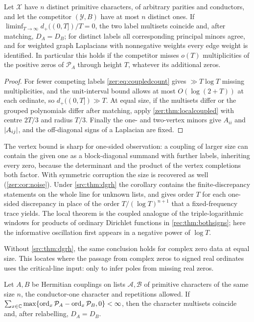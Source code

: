 \begin{corollary}\label{zer:cor:blindall}
Let $\mathcal X$ have $n$ distinct primitive characters, of arbitrary parities and conductors, and let the
competitor $(\mathcal Y,B)$ have at most $n$ distinct ones. If $\liminf_{T\to\infty}d_+((0,T])/T=0$, the two label
multisets coincide and, after matching, $D_A=D_B$; for distinct labels all corresponding principal minors
agree, and for weighted graph Laplacians with nonnegative weights every edge weight is identified. In
particular this holds if the competitor misses $o(T)$ multiplicities of the positive zeros of
$\mathcal P_A$ through height $T$, whatever its additional zeros.
\end{corollary}
\begin{proof}
For fewer competing labels \eqref{zer:eq:coupledcount} gives $\gg T\log T$ missing multiplicities, and the
unit-interval bound allows at most $O(\log(2+T))$ at each ordinate, so $d_+((0,T])\gg T$. At equal size,
if the multisets differ or the grouped polynomials differ after matching, apply
\cref{zer:thm:localcoupled} with centre $2T/3$ and radius $T/3$. Finally the one- and two-vertex minors
give $A_{ii}$ and $\lvert A_{ij}\rvert$, and the off-diagonal signs of a Laplacian are fixed.
\end{proof}

The vertex bound is sharp for one-sided observation: a coupling of larger size can contain the given one
as a block-diagonal summand with further labels, inheriting every zero, because the determinant and the
product of the vertex completions both factor. With symmetric corruption the size is recovered as well
(\cref{zer:cor:noise}). Under \cref{src:thm:dgrh} the corollary contains the finite-discrepancy
statements on the whole line for unknown lists, and gives order $T$ for each one-sided discrepancy in
place of the order $T/(\log T)^{n+1}$ that a fixed-frequency trace yields. The local theorem is the
coupled analogue of the triple-logarithmic windows for products of ordinary Dirichlet functions in
\cref{rec:thm:bothsigns}; here the informative oscillation first appears in a negative power of $\log T$.

Without \cref{src:thm:dgrh}, the same conclusion holds for complex zero data at equal size. This locates
where the passage from complex zeros to signed real ordinates uses the critical-line input: only to infer
poles from missing real zeros.

\begin{theorem}\label{zer:thm:complexdivisor}
Let $A,B$ be Hermitian couplings on lists $\mathcal A,\mathcal B$ of primitive characters of the same size $n$,
the conductor-one character and repetitions allowed. If
$\sum_{x\in\mathbb{C}}\max\{\operatorname{ord}_x\mathcal P_A-\operatorname{ord}_x\mathcal P_B,0\}<\infty$, then the
character multisets coincide and, after relabelling, $D_A=D_B$.
\end{theorem}

